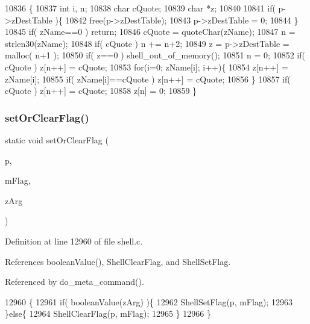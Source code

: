\begin{DoxyCode}
10836                                                             \{
10837   \textcolor{keywordtype}{int} i, n;
10838   \textcolor{keywordtype}{char} cQuote;
10839   \textcolor{keywordtype}{char} *z;
10840 
10841   \textcolor{keywordflow}{if}( p->zDestTable )\{
10842     free(p->zDestTable);
10843     p->zDestTable = 0;
10844   \}
10845   \textcolor{keywordflow}{if}( zName==0 ) \textcolor{keywordflow}{return};
10846   cQuote = quoteChar(zName);
10847   n = strlen30(zName);
10848   \textcolor{keywordflow}{if}( cQuote ) n += n+2;
10849   z = p->zDestTable = malloc( n+1 );
10850   \textcolor{keywordflow}{if}( z==0 ) shell_out_of_memory();
10851   n = 0;
10852   \textcolor{keywordflow}{if}( cQuote ) z[n++] = cQuote;
10853   \textcolor{keywordflow}{for}(i=0; zName[i]; i++)\{
10854     z[n++] = zName[i];
10855     \textcolor{keywordflow}{if}( zName[i]==cQuote ) z[n++] = cQuote;
10856   \}
10857   \textcolor{keywordflow}{if}( cQuote ) z[n++] = cQuote;
10858   z[n] = 0;
10859 \}
\end{DoxyCode}
\mbox{\label{shell_8c_a91d7989547f497aee7376bbd7faf3d84}} 
\subsubsection{set\+Or\+Clear\+Flag()}
{\footnotesize\ttfamily static void set\+Or\+Clear\+Flag (\begin{DoxyParamCaption}\item[{\textbf{ Shell\+State} $\ast$}]{p,  }\item[{unsigned}]{m\+Flag,  }\item[{const char $\ast$}]{z\+Arg }\end{DoxyParamCaption})\hspace{0.3cm}{\ttfamily [static]}}



Definition at line 12960 of file shell.\+c.



References boolean\+Value(), Shell\+Clear\+Flag, and Shell\+Set\+Flag.



Referenced by do\+\_\+meta\+\_\+command().


\begin{DoxyCode}
12960                                                                            \{
12961   \textcolor{keywordflow}{if}( booleanValue(zArg) )\{
12962     ShellSetFlag(p, mFlag);
12963   \}\textcolor{keywordflow}{else}\{
12964     ShellClearFlag(p, mFlag);
12965   \}
12966 \}
\end{DoxyCode}
\mbox{\label{shell_8c_a6a2ec33936522fb0586250dc61747ec3}} 
